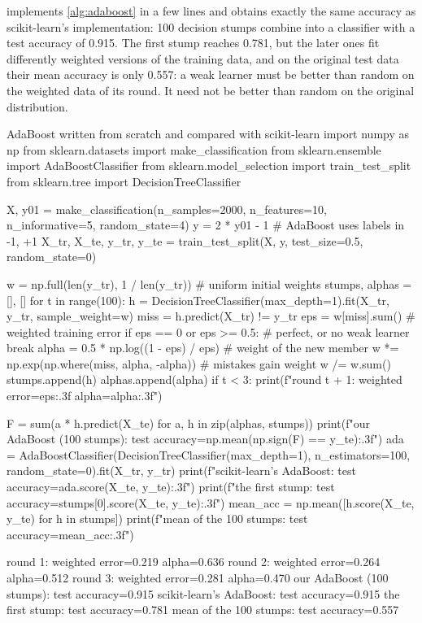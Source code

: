  implements \cref{alg:adaboost} in a few lines and obtains exactly the same
accuracy as scikit-learn's implementation: 100 decision stumps combine into a classifier with a test accuracy of 0.915. The first stump
reaches 0.781, but the later ones fit differently weighted versions of the training data, and on the
original test data their mean accuracy is only 0.557: a weak learner must be better than random on
the weighted data of its round. It need not be better than random on the original distribution.

\begin{pylisting}[label={lst:adaboost}]{AdaBoost written from scratch and compared with scikit-learn}
import numpy as np
from sklearn.datasets import make_classification
from sklearn.ensemble import AdaBoostClassifier
from sklearn.model_selection import train_test_split
from sklearn.tree import DecisionTreeClassifier

X, y01 = make_classification(n_samples=2000, n_features=10, n_informative=5,
                             random_state=4)
y = 2 * y01 - 1                                   # AdaBoost uses labels in {-1, +1}
X_tr, X_te, y_tr, y_te = train_test_split(X, y, test_size=0.5, random_state=0)

w = np.full(len(y_tr), 1 / len(y_tr))             # uniform initial weights
stumps, alphas = [], []
for t in range(100):
    h = DecisionTreeClassifier(max_depth=1).fit(X_tr, y_tr, sample_weight=w)
    miss = h.predict(X_tr) != y_tr
    eps = w[miss].sum()                           # weighted training error
    if eps == 0 or eps >= 0.5:                    # perfect, or no weak learner
        break
    alpha = 0.5 * np.log((1 - eps) / eps)         # weight of the new member
    w *= np.exp(np.where(miss, alpha, -alpha))    # mistakes gain weight
    w /= w.sum()
    stumps.append(h)
    alphas.append(alpha)
    if t < 3:
        print(f"round {t + 1}: weighted error={eps:.3f}  alpha={alpha:.3f}")

F = sum(a * h.predict(X_te) for a, h in zip(alphas, stumps))
print(f"our AdaBoost (100 stumps):  test accuracy={np.mean(np.sign(F) == y_te):.3f}")
ada = AdaBoostClassifier(DecisionTreeClassifier(max_depth=1), n_estimators=100,
                         random_state=0).fit(X_tr, y_tr)
print(f"scikit-learn's AdaBoost:    test accuracy={ada.score(X_te, y_te):.3f}")
print(f"the first stump:            test accuracy={stumps[0].score(X_te, y_te):.3f}")
mean_acc = np.mean([h.score(X_te, y_te) for h in stumps])
print(f"mean of the 100 stumps:      test accuracy={mean_acc:.3f}")
\end{pylisting}
\begin{pyoutput}
round 1: weighted error=0.219  alpha=0.636
round 2: weighted error=0.264  alpha=0.512
round 3: weighted error=0.281  alpha=0.470
our AdaBoost (100 stumps):  test accuracy=0.915
scikit-learn's AdaBoost:    test accuracy=0.915
the first stump:            test accuracy=0.781
mean of the 100 stumps:      test accuracy=0.557
\end{pyoutput}

